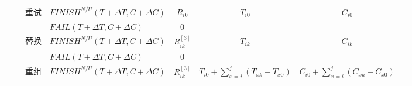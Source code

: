 \begin{table}[htbp]
\begin{threeparttable}
\begin{tabular}{llllllll}
            \multicolumn{1}{|c|}{} 
            &       
            & \multicolumn{1}{|c}{\multirow{2}{*}{重试}} 
            & \multicolumn{1}{|l}{$FINISH^{N/U}(T+\Delta T,C+\Delta C)$} 
            & \multicolumn{1}{|c}{$R_{i0}$} 
            & \multicolumn{1}{|c}{\multirow{2}{*}{$T_{i0}$}} 
            & \multicolumn{1}{|c|}{\multirow{2}{*}{$C_{i0}$}} \\
            
            \multicolumn{1}{|c|}{} 
            &       
            & \multicolumn{1}{|c}{}
            & \multicolumn{1}{|l}{$FAIL(T+\Delta T,C+\Delta C)$} 
            & \multicolumn{1}{|c}{0} 
            & \multicolumn{1}{|c}{}
            & \multicolumn{1}{|c|}{} \\
            \cline{3-7}
            
            \multicolumn{1}{|c|}{} 
            &       
            & \multicolumn{1}{|c}{\multirow{2}{*}{替换}} 
            & \multicolumn{1}{|l}{$FINISH^{N/U}(T+\Delta T,C+\Delta C)$} 
            & \multicolumn{1}{|c}{$R_{ik}^{[3]}$} 
            & \multicolumn{1}{|c}{\multirow{2}{*}{${T_{ik}}$}} 
            & \multicolumn{1}{|c|}{\multirow{2}{*}{${C_{ik}}$}} \\
            
            \multicolumn{1}{|c|}{} 
            &       
            & \multicolumn{1}{|c}{} 
            & \multicolumn{1}{|l}{$FAIL(T+\Delta T,C+\Delta C)$} 
            & \multicolumn{1}{|c}{0} 
            & \multicolumn{1}{|c}{} 
            & \multicolumn{1}{|c|}{} \\
            \cline{3-7}
            
            \multicolumn{1}{|c|}{} 
            &       
            & \multicolumn{1}{|c}{\multirow{2}{*}{重组}} 
            & \multicolumn{1}{|l}{$FINISH^{N/U}(T+\Delta T,C+\Delta C)$} 
            & \multicolumn{1}{|c}{$R_{ik}^{[3]}$} 
            & \multicolumn{1}{|c}{\multirow{2}{*}{${T_{i0}} + \sum\limits_{x = i}^j {({T_{xk}} - {T_{x0}})} $}}
            & \multicolumn{1}{|c|}{\multirow{2}{*}{${C_{i0}} + \sum\limits_{x = i}^j {({C_{xk}} - {C_{x0}})} $}} \\
            

\end{tabular}
\end{threeparttable}
\end{table}
